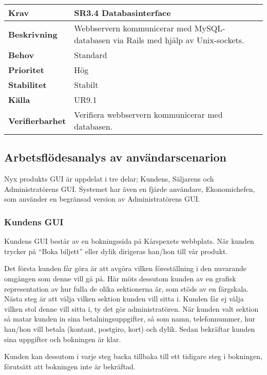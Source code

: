 \documentclass[a4paper, twoside, 11pt, titlepage]{article}
\begin{document}
	\begin{tabular} { p{2.6cm} p{12.5cm} }
		\hline
		\sffamily\textbf{Krav} & \sffamily\textbf{SR3.4 Databasinterface } \\
		\hline
		\sffamily\textbf{Beskrivning} & Webbservern kommunicerar med MySQL-databasen via Rails med hjälp av Unix-sockets.  \\
		\hline
		\sffamily\textbf{Behov} & Standard  \\
		\hline
		\sffamily\textbf{Prioritet} & Hög  \\
		\hline
		\sffamily\textbf{Stabilitet} & Stabilt  \\
		\hline
		\sffamily\textbf{Källa} & UR9.1  \\
		\hline
		\sffamily\textbf{Verifierbarhet} & Verifiera webbservern kommunicerar med databasen.  \\
		\hline
	\end{tabular}


	\subsection{Arbetsflödesanalys av användarscenarion}


	Nyx produkts GUI är uppdelat i tre delar; Kundens, Säljarens och Administratörens GUI. Systemet har även en fjärde användare, Ekonomichefen, som använder en begränsad version av Administratörens GUI.

		\subsubsection{Kundens GUI}


		Kundens GUI består av en bokningssida på Kårspexets webbplats. När kunden trycker på ``Boka biljett'' eller dylik dirigeras han/hon till vår produkt. 

		Det första kunden får göra är att avgöra vilken föreställning i den nuvarande omgången som denne vill gå på. Här möts dessutom kunden av en grafisk representation av hur fulla de olika sektionerna är, som stöds av en färgskala. Nästa steg är att välja vilken sektion kunden vill sitta i. Kunden får ej välja vilken stol denne vill sitta i, ty det gör administratören. När kunden valt sektion så matar kunden in sina betalningsuppgifter, så som namn, telefonnummer, hur han/hon vill betala (kontant, postgiro, kort) och dylik. Sedan bekräftar kunden sina uppgifter och bokningen är klar.

		Kunden kan dessutom i varje steg backa tillbaka till ett tidigare steg i bokningen, förutsätt att bokningen inte är bekräftad. 
\end{document}
